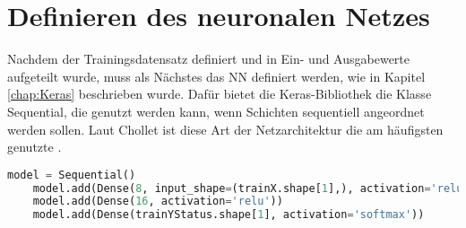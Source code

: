 \section{Definieren des neuronalen Netzes}
Nachdem der Trainingsdatensatz definiert und in Ein- und Ausgabewerte aufgeteilt wurde, muss als Nächstes das \ac{NN} definiert werden, wie in Kapitel \ref{chap:Keras} beschrieben wurde.
Dafür bietet die Keras-Bibliothek die Klasse \glqq Sequential\grqq{}, die genutzt werden kann, wenn Schichten sequentiell angeordnet werden sollen. Laut Chollet ist diese Art der 
Netzarchitektur die am häufigsten genutzte \cite[vgl. S.92]{DL_PY}. 

\begin{lstlisting}[language = python, caption={Erstellung eines sequentiellen Modells},captionpos=b, label = lst:ModellSeq, floatplacement=H]
    model = Sequential()
    model.add(Dense(8, input_shape=(trainX.shape[1],), activation='relu'))
    model.add(Dense(16, activation='relu'))
    model.add(Dense(trainYStatus.shape[1], activation='softmax'))
\end{lstlisting}

